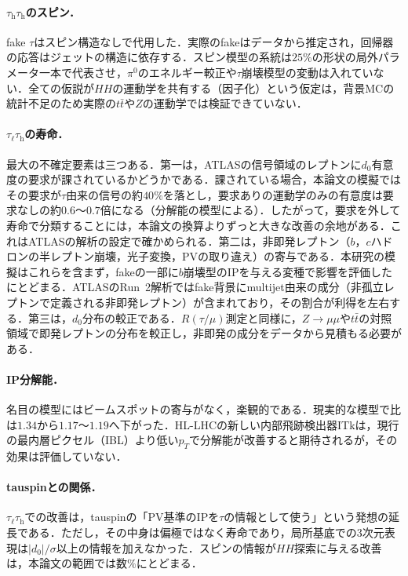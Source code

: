 \documentclass[paper=a4,fontsize=10pt,jafontsize=10pt,line_length=44zw,number_of_lines=46]{jlreq}
\newcommand{\tauh}{\tau_{\mathrm{h}}}
\newcommand{\taul}{\tau_{\ell}}
\begin{document}
\paragraph{$\tauh\tauh$のスピン．}fake $\tau$はスピン構造なしで代用した．実際のfakeはデータから推定され，回帰器の応答はジェットの構造に依存する．スピン模型の系統は$25\%$の形状の局外パラメータ一本で代表させ，$\pi^0$のエネルギー較正や$\tau$崩壊模型の変動は入れていない．全ての仮説が$HH$の運動学を共有する（因子化）という仮定は，背景MCの統計不足のため実際の$t\bar t$や$Z$の運動学では検証できていない．

\paragraph{$\taul\tauh$の寿命．}最大の不確定要素は三つある．第一は，ATLASの信号領域のレプトンに$d_0$有意度の要求が課されているかどうかである．課されている場合，本論文の模擬ではその要求が$\tau$由来の信号の約$40\%$を落とし，要求ありの運動学のみの有意度は要求なしの約$0.6$〜$0.7$倍になる（分解能の模型による）．したがって，要求を外して寿命で分類することには，本論文の換算よりずっと大きな改善の余地がある．これはATLASの解析の設定で確かめられる．第二は，非即発レプトン（$b$，$c$ハドロンの半レプトン崩壊，光子変換，PVの取り違え）の寄与である．本研究の模擬はこれらを含まず，fakeの一部に$b$崩壊型のIPを与える変種で影響を評価したにとどまる．ATLASのRun~2解析ではfake背景にmultijet由来の成分（非孤立レプトンで定義される非即発レプトン）が含まれており，その割合が利得を左右する．第三は，$d_0$分布の較正である．$R(\tau/\mu)$測定\cite{ATLAS:2020xea}と同様に，$Z\to\mu\mu$や$t\bar t$の対照領域で即発レプトンの分布を較正し，非即発の成分をデータから見積もる必要がある．

\paragraph{IP分解能．}名目の模型にはビームスポットの寄与がなく，楽観的である．現実的な模型で比は$1.34$から$1.17$〜$1.19$へ下がった．HL-LHCの新しい内部飛跡検出器ITk\cite{ATLAS:ITk}は，現行の最内層ピクセル（IBL）より低い$p_T$で分解能が改善すると期待されるが，その効果は評価していない．

\paragraph{tauspinとの関係．}$\taul\tauh$での改善は，tauspinの「PV基準のIPを$\tau$の情報として使う」という発想の延長である．ただし，その中身は偏極ではなく寿命であり，局所基底での3次元表現は$|d_0|/\sigma$以上の情報を加えなかった．スピンの情報が$HH$探索に与える改善は，本論文の範囲では数$\%$にとどまる．
\end{document}
